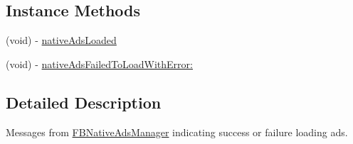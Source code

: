 \subsection*{Instance Methods}
\begin{DoxyCompactItemize}
\item 
(void) -\/ \hyperlink{protocol_f_b_native_ads_manager_delegate-p_ae0defdcc266e48819b2f7eb07eb7fb8d}{native\-Ads\-Loaded}
\item 
(void) -\/ \hyperlink{protocol_f_b_native_ads_manager_delegate-p_a66ed8569e0393c4001fe34bb47b04156}{native\-Ads\-Failed\-To\-Load\-With\-Error\-:}
\end{DoxyCompactItemize}


\subsection{Detailed Description}
Messages from \hyperlink{interface_f_b_native_ads_manager}{F\-B\-Native\-Ads\-Manager} indicating success or failure loading ads. 

